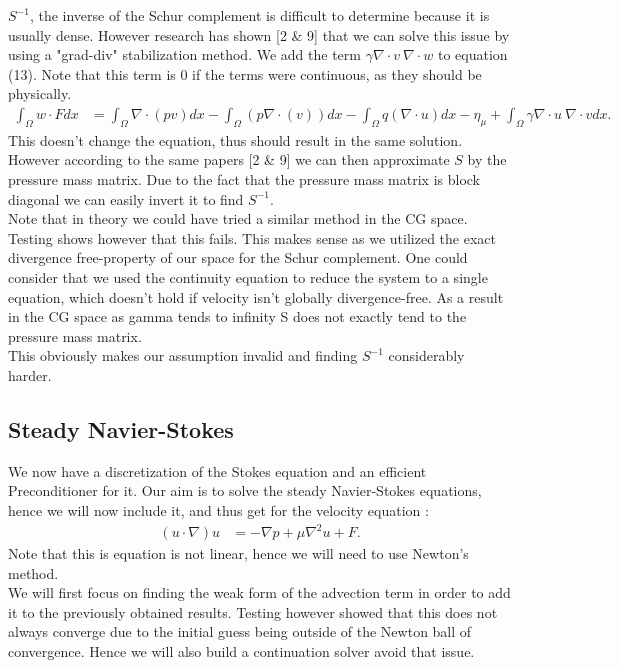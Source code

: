 \documentclass[11pt,twoside,a4paper]{article}
\begin{document}
 $S^{-1}$, the inverse of the Schur complement is difficult to determine because it is usually dense. However research has shown [2 \& 9] that we can solve this issue by using a "grad-div" stabilization method. We add the term $\gamma \nabla \cdot v \: \nabla \cdot w$ to equation (13). Note that this term is 0 if the terms were continuous, as they should be physically.
\begin{align}
\int_\Omega w \cdot F dx &= \int_\Omega \nabla \cdot (p v) dx - \int_\Omega ( p \nabla \cdot (v)) dx - \int_\Omega q (\nabla \cdot u) dx  - \eta_\mu + \int_\Omega \gamma \nabla \cdot u \: \nabla \cdot v dx .
\end{align}
This doesn't change the equation, thus should result in the same solution. However according to the same papers [2 \& 9] we can then approximate $S$ by the pressure mass matrix. Due to the fact that the pressure mass matrix is block diagonal we can easily invert it to find $S^{-1}$.
\\
Note that in theory we could have tried a similar method in the CG space.
Testing shows however that this fails.
This makes sense as we utilized the exact divergence free-property of our space for the Schur complement. One could consider that we used the continuity equation to reduce the system to a single equation, which doesn't hold if velocity isn't globally divergence-free.
As a result in the CG space as gamma tends to infinity S does not exactly tend to the pressure mass matrix.\\
This obviously makes our assumption invalid and finding $S^{-1}$ considerably harder.

\subsection{Steady Navier-Stokes}
We now have a discretization of the Stokes equation and an efficient Preconditioner for it.
Our aim is to solve the steady Navier-Stokes equations, hence we will now include it, and thus get for the velocity equation :
\begin{align*}
(u \cdot \nabla) u &= -\nabla p + \mu \nabla^2 u + F .
\end{align*}
Note that this is equation is not linear, hence we will need to use Newton's method.\\
We will first focus on finding the weak form of the advection term in order to add it to the previously obtained results. Testing however showed that this does not always converge due to the initial guess being outside of the Newton ball of convergence. Hence we will also build a continuation solver avoid that issue.
\end{document}

